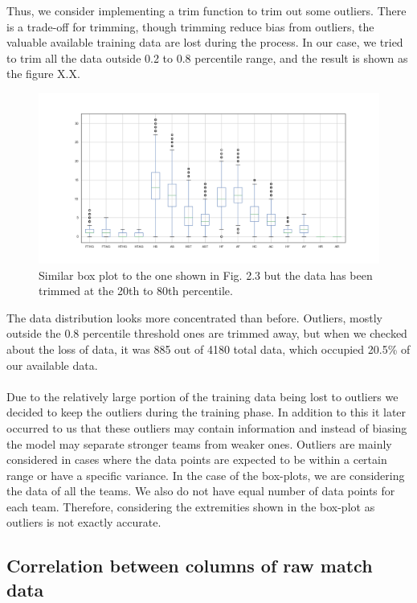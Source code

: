 \documentclass[a4paper,12pt]{article}
\begin{document}
	Thus, we consider implementing a trim function to trim out some outliers. There is a trade-off for trimming, though trimming reduce bias from outliers, the valuable available training data are lost during the process. In our case, we tried to trim all the data outside 0.2 to 0.8 percentile range, and the result is shown as the figure X.X.
	
	\begin{figure}[H]
		\renewcommand\thefigure{2.4}
		\centering
		
		\includegraphics[scale=0.4]{trimmed_box_plot.png}
		\caption{Similar box plot to the one shown in Fig. 2.3 but the data has been trimmed at the 20th to 80th percentile.}
	\end{figure}
	
	The data distribution looks more concentrated than before. Outliers, mostly outside the 0.8 percentile threshold ones are trimmed away, but when we checked about the loss of data, it was 885 out of 4180 total data, which occupied 20.5\% of our available data.\\
	\\
	Due to the relatively large portion of the training data being lost to outliers we decided to keep the outliers during the training phase. In addition to this it later occurred to us that these outliers may contain information and instead of biasing the model may separate stronger teams from weaker ones. Outliers are mainly considered in cases where the data points are expected to be within a certain range or have a specific variance. In the case of the box-plots, we are considering the data of all the teams. We also do not have equal number of data points for each team. Therefore, considering the extremities shown in the box-plot as outliers is not exactly accurate.
	
	\subsection{Correlation between columns of raw match data }
	
\end{document}
